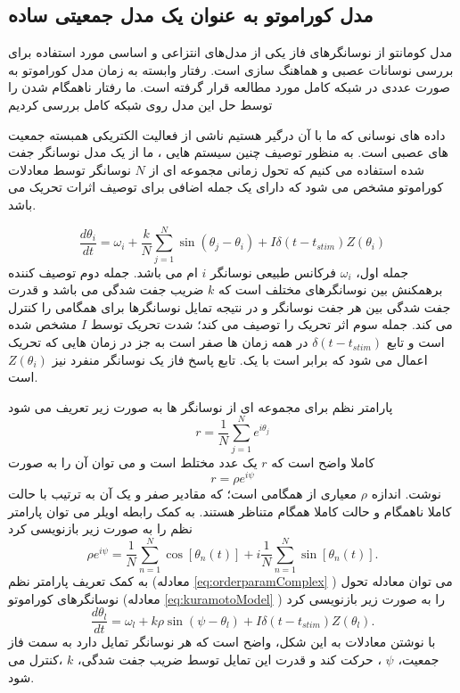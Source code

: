\subsection{ مدل کوراموتو به عنوان یک مدل جمعیتی ساده  }

مدل کومانتو از نوسانگرهای فاز یکی از مدل‌های انتزاعی و اساسی مورد استفاده برای بررسی نوسانات عصبی و هماهنگ سازی است.
رفتار وابسته به زمان مدل کوراموتو به صورت عددی در شبکه کامل مورد مطالعه قرار گرفته است. ما رفتار ناهمگام شدن را توسط حل این مدل روی شبکه کامل بررسی کردیم

داده های نوسانی که ما با آن درگیر هستیم ناشی از فعالیت الکتریکی همبسته جمعیت های عصبی است.
به منظور توصیف چنین سیستم هایی ، ما از یک مدل نوسانگر جفت شده استفاده می کنیم که تحول زمانی مجموعه ای از 
$N$
نوسانگر توسط معادلات کوراموتو مشخص می شود که دارای یک جمله اضافی برای توصیف اثرات تحریک می باشد.

\begin{equation}
    \frac{d \theta_i}{dt} = \omega_i + \frac{k}{N} \sum_{j=1}^{N} \sin(\theta_j -\theta_i) + I \delta(t-t_{stim}) Z(\theta_i)
    \label{eq:kuramotoModel}
\end{equation}
جمله اول، 
$\omega_i$
فرکانس طبیعی نوسانگر 
$i$ 
ام می باشد.
جمله دوم توصیف کننده برهمکنش بین نوسانگرهای مختلف است که 
$k$
ضریب جفت شدگی می باشد و قدرت جفت شدگی بین هر جفت نوسانگر و در نتیجه تمایل نوسانگرها برای همگامی را کنترل می کند. 
جمله سوم اثر تحریک را توصیف می کند؛ شدت تحریک توسط 
$I$
مشخص شده است و تابع 
$\delta(t-t_{stim})$
در همه زمان ها صفر است به جز در زمان هایی که تحریک اعمال می شود که برابر است با یک.
تابع پاسخ فاز یک نوسانگر منفرد نیز
$Z(\theta_i)$
است.

پارامتر نظم برای مجموعه ای از نوسانگر ها به صورت زیر تعریف می شود
\begin{equation}
    r=\frac{1}{N} \sum_{j=1}^{N} e^{i \theta_j}
    \label{eq:orderParam}
\end{equation}
کاملا واضح است که 
$r$
یک عدد مختلط است و می توان آن را به صورت 
\begin{equation}
    r=\rho e^{i \psi}
    \label{eq:orderparamComplex}
\end{equation}
نوشت. 
اندازه 
$\rho$
معیاری از همگامی است؛ که مقادیر صفر و یک آن به ترتیب با حالت کاملا ناهمگام و حالت کاملا همگام متناظر هستند. به کمک رابطه اویلر می توان پارامتر نظم را به صورت زیر بازنویسی کرد
\begin{equation}
    \rho e^{i \psi} = \frac{1}{N} \sum_{n=1}^{N} \cos [\theta_n(t)] + i \frac{1}{N} \sum_{n=1}^{N} \sin [\theta_n(t)].
    \label{eq:orderParamExpansion}
\end{equation}
به کمک تعریف پارامتر نظم (معادله
\ref{eq:orderparamComplex}
)
می توان معادله تحول نوسانگرهای کوراموتو (معادله
\ref{eq:kuramotoModel}
)
را به صورت زیر بازنویسی کرد
\begin{equation}
      \frac{d \theta_l}{dt} = \omega _l + k \rho \sin ( \psi - \theta_l) + I \delta(t-t_{stim}) Z(\theta_l).
\end{equation}
با نوشتن معادلات به این شکل، واضح است که هر نوسانگر تمایل دارد به سمت فاز جمعیت،
$\psi$
، حرکت کند و قدرت این تمایل توسط ضریب جفت شدگی، 
$k$
،کنترل می شود.


